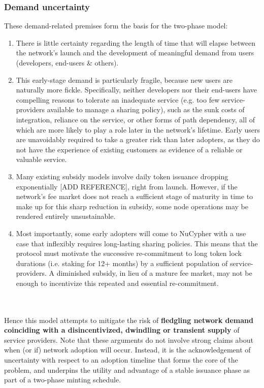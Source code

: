 \documentclass[longbibliography,nofootinbib]{revtex4-1}
\begin{document}
\subsubsection{Demand uncertainty}\label{demand}

These demand-related premises form the basis for the two-phase model: 
\begin{enumerate}
\item There is little certainty regarding the length of time that will elapse between the network's launch and the development of meaningful demand from users (developers, end-users \& others).
\item This early-stage demand is particularly fragile, because new users are naturally more fickle. Specifically, neither developers nor their end-users have compelling reasons to tolerate an inadequate service (e.g. too few service-providers available to manage a sharing policy), such as the sunk costs of integration, reliance on the service, or other forms of path dependency, all of which are more likely to play a role later in the network's lifetime. Early users are unavoidably required to take a greater risk than later adopters, as they do not have the experience of existing customers as evidence of a reliable or valuable service.
\item Many existing subsidy models involve daily token issuance dropping exponentially [ADD REFERENCE], right from launch. However, if the network's fee market does not reach a sufficient stage of maturity in time to make up for this sharp reduction in subsidy, some node operations may be rendered entirely unsustainable. 
\item Most importantly, some early adopters will come to NuCypher with a use case that inflexibly requires long-lasting sharing policies. This means that the protocol must motivate the successive re-commitment to long token lock durations (i.e. staking for 12+ months) by a sufficient population of service-providers. A diminished subsidy, in lieu of a mature fee market, may not be enough to incentivize this repeated and essential re-commitment. 
\end{enumerate}

\\\\
Hence this model attempts to mitigate the risk of \textbf{fledgling network demand coinciding with a disincentivized, dwindling or transient supply} of service providers. Note that these arguments do not involve strong claims about when (or if) network adoption will occur. Instead, it is the acknowledgement of uncertainty with respect to an adoption timeline that forms the core of the problem, and underpins the utility and advantage of a stable issuance phase as part of a two-phase minting schedule. 
\end{document}
